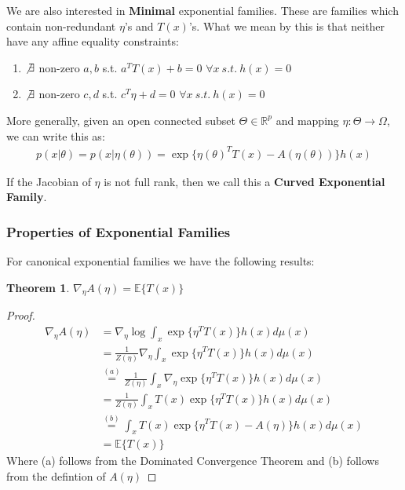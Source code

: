 \documentclass[]{article}
\theoremstyle{mattstyle}
\newtheorem{theorem}{Theorem}[section]
\theoremstyle{definition}
\begin{document}
We are also interested in \textbf{Minimal} exponential families. These are families which contain non-redundant $\eta$'s and $T(x)$'s. What we mean by this is that neither have any affine equality constraints:
\begin{enumerate}
	\item $\not\exists$ non-zero $a,b$ s.t. $a^TT(x)+b=0$ $\forall x \ s.t.\ h(x)=0$
	\item $\not\exists$ non-zero $c,d$ s.t. $c^T\eta+d=0$ $\forall x \ s.t.\ h(x)=0$
\end{enumerate}

More generally, given an open connected subset $\Theta \in \mathbb{R}^p$ and mapping $\eta: \Theta \rightarrow \Omega$, we can write this as:
\begin{align}
p(x|\theta) = p(x|\eta(\theta)) = \exp\{ \eta(\theta)^TT(x) - A(\eta(\theta))\}h(x)
\end{align}

If the Jacobian of $\eta$ is not full rank, then 
we call this a \textbf{Curved Exponential Family}.

\subsubsection{Properties of Exponential Families}

For canonical exponential families we have the following results:

\begin{theorem}
	$\nabla_{\eta}A(\eta) = \mathbb{E}\{T(x)\}$
\end{theorem}
\begin{proof}
	\begin{align*}
	\nabla_{\eta}A(\eta) &= \nabla_{\eta} \log \int_x \exp\{ \eta^TT(x)\}h(x)d\mu(x)\\
	&= \frac{1}{Z(\eta)}\nabla_{\eta} \int_x \exp\{ \eta^TT(x)\}h(x)d\mu(x)\\
	&\overset{(a)}{=} \frac{1}{Z(\eta)}\int_x \nabla_{\eta} \exp\{ \eta^TT(x)\}h(x)d\mu(x)\\
	&= \frac{1}{Z(\eta)}\int_x T(x)\exp\{ \eta^TT(x)\}h(x)d\mu(x)\\
	&\overset{(b)}{=}\int_x T(x)\exp\{ \eta^TT(x)-A(\eta)\}h(x)d\mu(x)\\
	&=\mathbb{E}\{T(x)\}
	\end{align*}
	Where (a) follows from the Dominated Convergence Theorem and (b) follows from the defintion of $A(\eta)$
\end{proof}
\end{document}
